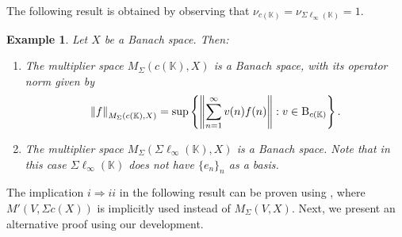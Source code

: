 \documentclass[14pt, a4paper]{article}  %
\providecommand{\norm}[1]{\left\lVert#1\right\rVert}
\newcommand{\K}{\mathbb{K}}
\newcommand{\B}{\textup{B}}
\newcommand{\Mt}{M'}
\newtheorem{example}{Example}[section]  %
\begin{document}
 

	The following result is obtained by observing that $\nu_{c(\K)} = \nu_{\Sigma \ell_{\infty}(\K)} = 1$.
	\begin{example} Let $X$ be a Banach space. Then:
		\begin{enumerate}
			\item[i.] The multiplier space $M_{\Sigma}(c(\K), X)$ is a Banach space, with its operator norm   given by 
			\begin{equation}
				\norm{f}_{M_{\Sigma}(c(\K), X)} = \sup \left\{ \norm{\sum_{n=1}^{\infty} v(n) f(n)} : v \in \B_{c(\K)} \right\}.
			\end{equation}
			\item[ii.] The multiplier space $M_{\Sigma}(\Sigma \ell_{\infty}(\K), X)$ is a Banach space. Note that in this case $\Sigma \ell_{\infty}(\K)$ does not have $\{e_{n}\}_{n}$ as a basis.
		\end{enumerate}
	\end{example}




 



The implication $i \Longrightarrow ii$ in the following result can be proven using \cite[Thm. I.17.1, p. 211]{S}, where $\Mt(V, \Sigma c(X))$ is implicitly used instead of $M_{\Sigma}(V, X)$. Next, we present an alternative proof using our development.
\end{document}
